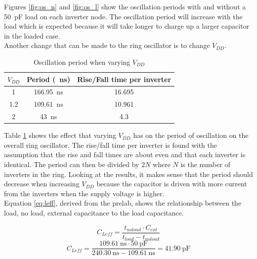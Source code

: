 \documentclass[CMPE]{../KGCOEReport}
\begin{document}
	Figures \ref{fig:os_n} and \ref{fig:os_l} show the oscillation periods with and
	without a \SI{50}{\pico\farad} load on each inverter node. The oscillation period
	will increase with the load which is expected because it will take longer to charge
	up a larger capacitor in the loaded case.\\

	Another change that can be made to the ring oscillator is to change $V_{DD}$.
	
	\pagebreak

	\begin{table}[h!]
		\renewcommand{\arraystretch}{1.3}
		\setlength{\tabcolsep}{12pt}
		\caption{Oscillation period when varying $V_{DD}$}
		\begin{center}
		    \begin{tabular}{|c|c|c|}\hline
		    $V_{DD}$ & Period (\SI{}{\nano\s}) & Rise/Fall time per inverter \\\hline
		    1   & \SI{166.95}{\nano\s} & 16.695 \\\hline
		    1.2 & \SI{109.61}{\nano\s} & 10.961 \\\hline
		    2   & \SI{43}{\nano\s} & 4.3 \\\hline
		    \end{tabular}
		\end{center}
		\label{tab:p6}
	\end{table}

	Table \ref{tab:p6} shows the effect that varying $V_{DD}$ has on the period of
	oscillation on the overall ring oscillator. The rise/fall time per inverter is
	found with the assumption that the rise and fall times are about even and that each
	inverter is identical. The period can then be divided by $2N$ where $N$ is the number
	of inverters in the ring. Looking at the results, it makes sense that the period
	should decrease when increasing $V_{DD}$ because the capacitor is driven with more
	current from the inverters when the supply voltage is higher.\\

	Equation \ref{eq:leff}, derived from the prelab, shows the relationship
	between the load, no load, external capacitance to the load capacitance.

	\begin{equation}
	\label{eq:leff}
	C_{Leff} = \frac{t_{noload} \cdot C_{ext}}{t_{load} - t_{noload}}
	\end{equation}
	\begin{equation}
	\label{eq:leff_actual}
	C_{Leff} = \frac{\SI{109.61}{\nano\s} \cdot \SI{50}{\pico\farad}}{\SI{240.30}{\nano\s} - \SI{109.61}{\nano\s}} = \SI{41.90}{\pico\farad}
	\end{equation}
\end{document}
